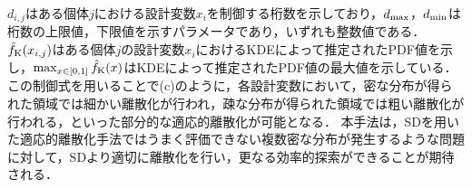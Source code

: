 \documentclass[../main/main]{subfiles}
\begin{document}
$d_{i,j}$はある個体$j$における設計変数$x_i$を制御する桁数を示しており，$d_{\rm max}$，$d_{\rm min}$は桁数の上限値，下限値を示すパラメータであり，いずれも整数値である．
$\hat{f}_{\rm K}(x_{i,j})$はある個体$j$の設計変数$x_i$におけるKDEによって推定されたPDF値を示し，$\max_{x \in [0,1]}\hat{f}_{\rm K}(x)$はKDEによって推定されたPDF値の最大値を示している．
この制御式を用いることで(c)のように，各設計変数において，密な分布が得られた領域では細かい離散化が行われ，疎な分布が得られた領域では粗い離散化が行われる，といった部分的な適応的離散化が可能となる．
本手法は，SDを用いた適応的離散化手法ではうまく評価できない複数密な分布が発生するような問題に対して，SDより適切に離散化を行い，更なる効率的探索ができることが期待される．
\end{document}
